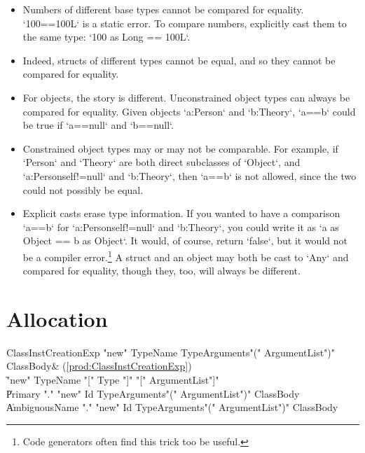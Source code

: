 \begin{itemize}

\item Numbers of different base types cannot be compared for equality.  
\xcd`100==100L` is a static error.  To compare numbers, explicitly cast them
to the same type: \xcd`100 as Long == 100L`.

\item Indeed, structs of different types cannot be equal, and so they cannot be
compared for equality.  

\item For objects, the story is different. Unconstrained object types can
      always be compared for equality. Given objects \xcd`a:Person` and
      \xcd`b:Theory`, \xcd`a==b` could be true if \xcd`a==null` and
      \xcd`b==null`. 

\item Constrained object types may or may not be comparable.  For example,  
      if \xcd`Person` and \xcd`Theory` are both direct subclasses of
      \xcd`Object`, and \xcd`a:Person{self!=null}` and \xcd`b:Theory`, then
      \xcd`a==b` is not allowed, since the two could not possibly be equal.

\item Explicit casts erase type information.  If you wanted
      to have a comparison \xcd`a==b` for \xcd`a:Person{self!=null}` and
      \xcd`b:Theory`, you could write it as \xcd`a as Object == b as Object`.
      It would, of course, return \xcd`false`, but it would not be a compiler
      error.\footnote{Code generators often find this trick too be useful.}
      A struct and an object may both be cast to \xcd`Any` and compared for
      equality, though they, too, will always be different.

\end{itemize}





\section{Allocation}
\label{ClassCreation}

\begin{bbgrammar}
ClassInstCreationExp \: \xcd"new" TypeName TypeArguments\opt \xcd"(" ArgumentList\opt \xcd")" ClassBody\opt & (\ref{prod:ClassInstCreationExp}) \\
                    \| \xcd"new" TypeName \xcd"[" Type \xcd"]" \xcd"[" ArgumentList\opt \xcd"]" \\
                    \| Primary \xcd"." \xcd"new" Id TypeArguments\opt \xcd"(" ArgumentList\opt \xcd")" ClassBody\opt \\
                    \| AmbiguousName \xcd"." \xcd"new" Id TypeArguments\opt \xcd"(" ArgumentList\opt \xcd")" ClassBody\opt \\
\end{bbgrammar}

